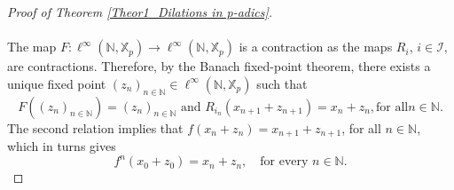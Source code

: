\documentclass[a4paper, 12pt]{article}
\theoremstyle{definition}
\begin{document}
\begin{proof}[Proof of Theorem \ref{Theor1_Dilations in p-adics}]
		\paragraph{}        
		The map $F: \ell^{ \infty } \left(   \mathbb{N} ,   \mathbb{X}_{p}  \right) \to \ell^{ \infty } \left(   \mathbb{N} ,   \mathbb{X}_{p}  \right) $ is a contraction as the maps $R_{i}$, $i\in \mathcal{I}$, are contractions. Therefore, by the Banach fixed-point theorem, there exists a unique fixed point $ \left(  z_{n}   \right)_{n \in \mathbb{N} } \in \ell^{ \infty } \left(   \mathbb{N} ,   \mathbb{X}_{p}  \right) $ such that  
		\begin{equation}\label{Eq1_Fixed Point}
			F \left(   \left(  z_{n}   \right)_{n \in \mathbb{N} }  \right)     =    \left(  z_{n}   \right)_{n \in \mathbb{N} }   \text{ and }        R_{i_{n}}  \left(  x_{n+1} + z_{n+1}  \right)    =    x_{n} + z_{n},   \text{for all}   n \in  \mathbb{N} .  
		\end{equation}
		The second relation implies that $ f \left(  x_{n} + z_{n}  \right)  = x_{n+1} + z_{n+1} $, for all $n \in \mathbb{N} $, which in turns gives  
		\begin{equation}\label{Eq1_Shadowing Point}
			f^{n} \left(  x_{0} + z_{0}  \right)    =   x_{n} + z_{n}, \quad \text{for every } n \in  \mathbb{N} . 
		\end{equation}
		

\end{proof}
\end{document}

